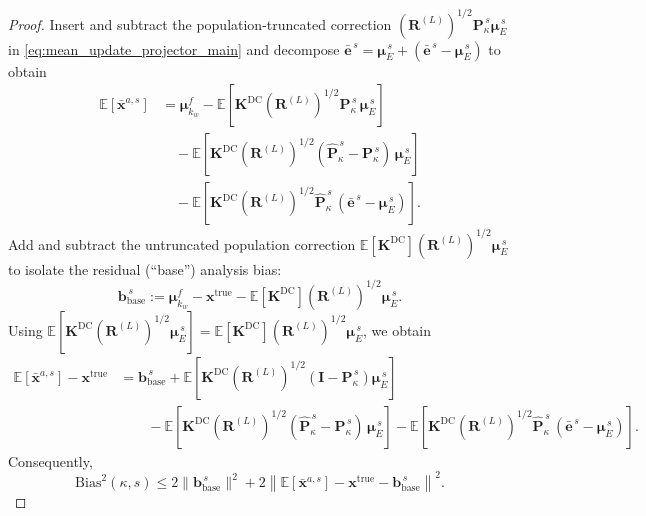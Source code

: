 \documentclass[11pt,a4paper]{article}
\begin{document}
\begin{proof}
\smallskip
	\noindent Insert and subtract the population-truncated correction $(\mathbf{R}^{(L)})^{1/2}\mathbf{P}_\kappa^{\,s}\boldsymbol{\mu}_E^{\,s}$ in \eqref{eq:mean_update_projector_main} and decompose $\bar{\mathbf{e}}^{\,s}=\boldsymbol{\mu}_E^{\,s}+(\bar{\mathbf{e}}^{\,s}-\boldsymbol{\mu}_E^{\,s})$ to obtain
		\begin{align*}
			\mathbb{E}[\bar{\mathbf{x}}^{a,s}]
			&=
			\boldsymbol{\mu}_{k_w}^f
			-
			\mathbb{E}\!\left[\mathbf{K}^{\mathrm{DC}}(\mathbf{R}^{(L)})^{1/2}\mathbf{P}_\kappa^{\,s}\,\boldsymbol{\mu}_E^{\,s}\right]\\
	&\quad-
	\mathbb{E}\!\left[\mathbf{K}^{\mathrm{DC}}(\mathbf{R}^{(L)})^{1/2}(\hat{\mathbf{P}}_\kappa^{\,s}-\mathbf{P}_\kappa^{\,s})\,\boldsymbol{\mu}_E^{\,s}\right]\\
	&\quad-
	\mathbb{E}\!\left[\mathbf{K}^{\mathrm{DC}}(\mathbf{R}^{(L)})^{1/2}\hat{\mathbf{P}}_\kappa^{\,s}\,(\bar{\mathbf{e}}^{\,s}-\boldsymbol{\mu}_E^{\,s})\right].
	\end{align*}
	Add and subtract the untruncated population correction $\mathbb{E}[\mathbf{K}^{\mathrm{DC}}](\mathbf{R}^{(L)})^{1/2}\boldsymbol{\mu}_E^{\,s}$ to isolate the residual (``base'') analysis bias:
\begin{equation}
		\mathbf{b}_{\mathrm{base}}^{\,s}
		:=
			\boldsymbol{\mu}_{k_w}^f-\mathbf{x}^{\mathrm{true}}-\mathbb{E}[\mathbf{K}^{\mathrm{DC}}](\mathbf{R}^{(L)})^{1/2}\boldsymbol{\mu}_E^{\,s}.
\end{equation}
	Using $\mathbb{E}[\mathbf{K}^{\mathrm{DC}}(\mathbf{R}^{(L)})^{1/2}\boldsymbol{\mu}_E^{\,s}]=\mathbb{E}[\mathbf{K}^{\mathrm{DC}}](\mathbf{R}^{(L)})^{1/2}\boldsymbol{\mu}_E^{\,s}$, we obtain
	\begin{align*}
	\mathbb{E}[\bar{\mathbf{x}}^{a,s}]-\mathbf{x}^{\mathrm{true}}
	&=
	\mathbf{b}_{\mathrm{base}}^{\,s}
	+
	\mathbb{E}\!\left[\mathbf{K}^{\mathrm{DC}}(\mathbf{R}^{(L)})^{1/2}(\mathbf{I}-\mathbf{P}_\kappa^{\,s})\boldsymbol{\mu}_E^{\,s}\right]\\
	&\qquad
	-
	\mathbb{E}\!\left[\mathbf{K}^{\mathrm{DC}}(\mathbf{R}^{(L)})^{1/2}(\hat{\mathbf{P}}_\kappa^{\,s}-\mathbf{P}_\kappa^{\,s})\,\boldsymbol{\mu}_E^{\,s}\right]
	-
	\mathbb{E}\!\left[\mathbf{K}^{\mathrm{DC}}(\mathbf{R}^{(L)})^{1/2}\hat{\mathbf{P}}_\kappa^{\,s}\,(\bar{\mathbf{e}}^{\,s}-\boldsymbol{\mu}_E^{\,s})\right].
	\end{align*}
	Consequently,
\begin{equation}
	\mathrm{Bias}^2(\kappa,s)
	\le
	2\|\mathbf{b}_{\mathrm{base}}^{\,s}\|^2
	+
	2\left\|\mathbb{E}[\bar{\mathbf{x}}^{a,s}]-\mathbf{x}^{\mathrm{true}}-\mathbf{b}_{\mathrm{base}}^{\,s}\right\|^2.

\end{equation}
\end{proof}
\end{document}

